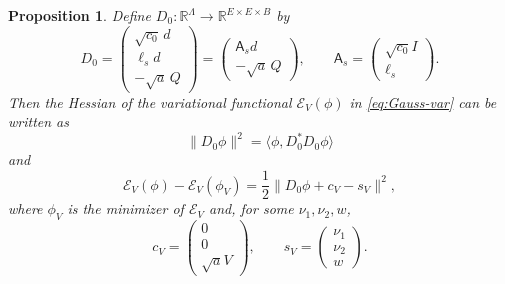 \documentclass[11pt]{article}
\newcommand{\R}{\mathbb R}
\newcommand{\Id}{I}
\numberwithin{equation}{section}
\newtheorem{proposition}[theorem]{Proposition}
\theoremstyle{definition}
\theoremstyle{plain}
\begin{document}
\begin{proposition} \label{prop:D0}
Define $D_0: \R^\Lambda \to \R^{E \times E \times B}$ by
\begin{equation}
  D_0
  =\begin{pmatrix}
       \sqrt{c_0}\,d\\ \ell_s d\\ -\sqrt a\,Q
  \end{pmatrix}
  =\begin{pmatrix}
       \mathsf A_s d\\ -\sqrt a\,Q
  \end{pmatrix},
 \qquad
 \mathsf A_s=\begin{pmatrix}\sqrt{c_0}\Id\\\ell_s\end{pmatrix}.
\end{equation}
Then the Hessian of the variational functional $\mathcal E_V(\phi)$ in \eqref{eq:Gauss-var} can be written as
\begin{equation}
 \|D_0\phi\|^2
 = \langle \phi, D_0^* D_0 \phi \rangle
\end{equation}
and
\begin{equation}
  \mathcal E_V(\phi)- \mathcal E_V(\phi_V)
  = \frac12 \|D_0\phi +c_V - s_V\|^2,
\end{equation}
where $\phi_V$ is the minimizer of $\mathcal E_V$ and, for some $\nu_1,\nu_2,w$,
\begin{equation}
  c_V = \begin{pmatrix}
  0 \\ 0 \\ \sqrt{a}V
  \end{pmatrix},
  \qquad
  s_V
  = \begin{pmatrix}
    \nu_1 \\ \nu_2 \\ w
  \end{pmatrix}
  .
\end{equation}
\end{proposition}
\end{document}
